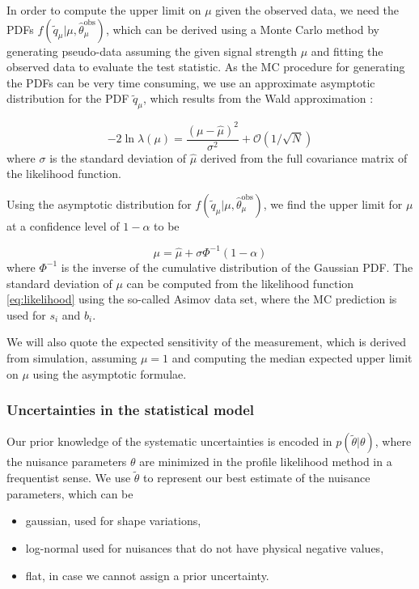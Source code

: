 In order to compute the upper limit on $\mu$ given the observed data, we need the PDFs $f(\tilde{q}_\mu | \mu, \hat{\theta}_\mu^{\mathrm{obs}})$, which can be derived using a Monte Carlo method by generating pseudo-data assuming the given signal strength $\mu$ and fitting the observed data to evaluate the test statistic. As the MC procedure for generating the PDFs can be very time consuming, we use an approximate asymptotic distribution \cite{Cowan:2010js} for the PDF $\tilde{q}_\mu$, which results from the Wald approximation \cite{wald1943tests}:

\begin{equation}
-2 \ln{\lambda(\mu)} = \frac{(\mu - \hat{\mu})^2}{\sigma^2}+ \mathcal{O}(1/\sqrt{N})
\end{equation}
where $\sigma$ is the standard deviation of $\hat{\mu}$ derived from the full covariance matrix of the likelihood function.

Using the asymptotic distribution for $f(\tilde{q}_\mu | \mu, \hat{\theta}_\mu^{\mathrm{obs}})$, we find the upper limit for $\mu$ at a confidence level of $1 - \alpha$ to be

\begin{equation}
\mu = \hat{\mu} + \sigma \Phi^{-1}(1 - \alpha)
\end{equation}
where $\Phi^{-1}$ is the inverse of the cumulative distribution of the Gaussian PDF. The standard deviation of $\mu$ can be computed from the likelihood function \cref{eq:likelihood} using the so-called Asimov data set, where the MC prediction is used for $s_i$ and $b_i$.

We will also quote the expected sensitivity of the measurement, which is derived from simulation, assuming $\mu = 1$ and computing the median expected upper limit on $\mu$ using the asymptotic formulae. 

\subsubsection{Uncertainties in the statistical model}

Our prior knowledge of the systematic uncertainties is encoded in $p(\tilde{\theta} | \theta)$, where the nuisance parameters $\theta$ are minimized in the profile likelihood method in a frequentist sense. We use $\tilde{\theta}$ to represent our best estimate of the nuisance parameters, which can be
\begin{itemize}
\item gaussian, used for shape variations,
\item log-normal used for nuisances that do not have physical negative values,
\item flat, in case we cannot assign a prior uncertainty.
\end{itemize}

